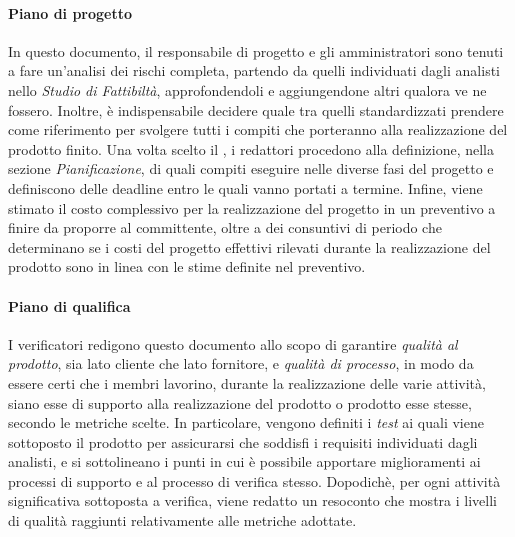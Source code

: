 		\paragraph{Piano di progetto}
			In questo documento, il responsabile di progetto e gli amministratori sono tenuti a fare un'analisi dei rischi completa, partendo da quelli individuati dagli analisti nello \textit{Studio di Fattibiltà}, approfondendoli e aggiungendone altri qualora ve ne fossero. Inoltre, è indispensabile decidere quale  tra quelli standardizzati prendere come riferimento per svolgere tutti i compiti che porteranno alla realizzazione del prodotto finito. Una volta scelto il , i redattori procedono alla definizione, nella sezione \textit{Pianificazione}, di quali compiti eseguire nelle diverse fasi del progetto e definiscono delle deadline entro le quali vanno portati a termine. Infine, viene stimato il costo complessivo per la realizzazione del progetto in un preventivo a finire da proporre al committente, oltre a dei consuntivi di periodo che determinano se i costi del progetto effettivi rilevati durante la realizzazione del prodotto sono in linea con le stime definite nel preventivo.
		\paragraph{Piano di qualifica}
 			I verificatori redigono questo documento allo scopo di garantire \textit{qualità al prodotto}, sia lato cliente che lato fornitore, e \textit{qualità di processo}, in modo da essere certi che i membri lavorino, durante la realizzazione delle varie attività, siano esse di supporto alla realizzazione del prodotto o prodotto esse stesse, secondo le metriche scelte. In particolare, vengono definiti i \textit{test} ai quali viene sottoposto il prodotto per assicurarsi che soddisfi i requisiti individuati dagli analisti, e si sottolineano i punti in cui è possibile apportare miglioramenti ai processi di supporto e al processo di verifica stesso. Dopodichè, per ogni attività significativa sottoposta a verifica, viene redatto un resoconto che mostra i livelli di qualità raggiunti relativamente alle metriche adottate.